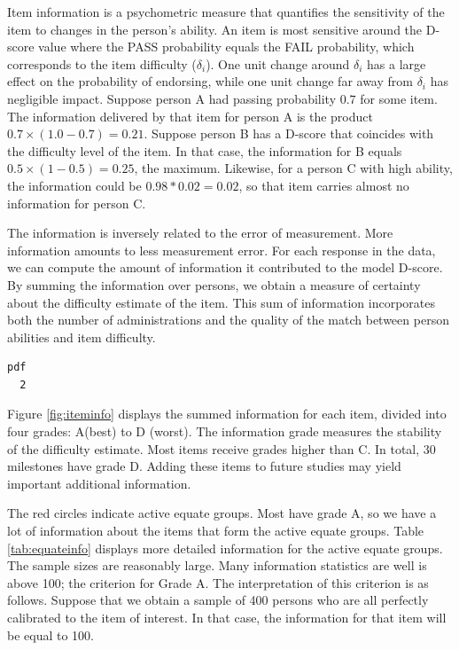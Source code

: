 \documentclass[
]{book}
\begin{document}
Item information is a psychometric measure that quantifies the sensitivity of the item to changes in the person's ability. An item is most sensitive around the D-score value where the PASS probability equals the FAIL probability, which corresponds to the item difficulty (\(\delta_i\)). One unit change around \(\delta_i\) has a large effect on the probability of endorsing, while one unit change far away from \(\delta_i\) has negligible impact. Suppose person A had passing probability \(0.7\) for some item. The information delivered by that item for person A is the product \(0.7 \times (1.0 - 0.7) = 0.21\). Suppose person B has a D-score that coincides with the difficulty level of the item. In that case, the information for B equals \(0.5 \times (1 - 0.5) = 0.25\), the maximum. Likewise, for a person C with high ability, the information could be \(0.98 * 0.02 = 0.02\), so that item carries almost no information for person C.

The information is inversely related to the error of measurement. More information amounts to less measurement error. For each response in the data, we can compute the amount of information it contributed to the model D-score. By summing the information over persons, we obtain a measure of certainty about the difficulty estimate of the item. This sum of information incorporates both the number of administrations and the quality of the match between person abilities and item difficulty.

\begin{verbatim}
pdf 
  2 
\end{verbatim}



Figure \ref{fig:iteminfo} displays the summed information for each item, divided into four grades: A(best) to D (worst). The information grade measures the stability of the difficulty estimate. Most items receive grades higher than C. In total, 30 milestones have grade D. Adding these items to future studies may yield important additional information.

The red circles indicate active equate groups. Most have grade A, so we have a lot of information about the items that form the active equate groups. Table \ref{tab:equateinfo} displays more detailed information for the active equate groups. The sample sizes are reasonably large. Many information statistics are well is above 100; the criterion for Grade A. The interpretation of this criterion is as follows. Suppose that we obtain a sample of 400 persons who are all perfectly calibrated to the item of interest. In that case, the information for that item will be equal to 100.
\end{document}
